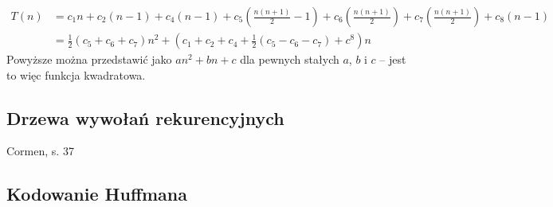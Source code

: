 \documentclass[10pt, oneside]{article}
\theoremstyle{remark}
\begin{document}
\begin{align*}
T(n) &= c_{1}n + c_2 (n-1) + c_4 (n-1) + c_5 \left ( \frac{n(n+1)}{2} - 1 \right ) + c_6 \left ( \frac{n(n+1)}{2} \right ) + c_7 \left ( \frac{n(n+1)}{2} \right ) + c_8 (n-1)\\
&= \frac{1}{2} \left(c_5 + c_6 + c_7 \right) n^2 + \left(c_1 + c_2 +c_4 + \frac{1}{2} \left(c_5 - c_6 - c_7\right) + c^8 \right)n
\end{align*}
Powyższe można przedstawić jako $an^2 + bn + c$ dla pewnych stałych $a$, $b$ i $c$ -- jest to więc funkcja kwadratowa.

\subsection{Drzewa wywołań rekurencyjnych}
Cormen, s. 37

\subsection{Kodowanie Huffmana}
\end{document}
